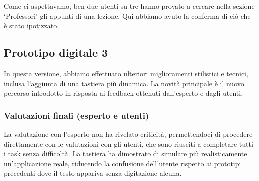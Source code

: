 Come ci aspettavamo, ben due utenti su tre hanno provato a cercare nella sezione ‘Professori’ gli appunti di una lezione. Qui abbiamo avuto la conferma di ciò che è stato ipotizzato.

\subsection{Prototipo digitale 3}
In questa versione, abbiamo effettuato ulteriori miglioramenti stilistici e tecnici, inclusa l’aggiunta di una tastiera più dinamica.
La novità principale è il nuovo percorso introdotto in risposta ai feedback ottenuti dall’esperto e dagli utenti.

\subsubsection{Valutazioni finali (esperto e utenti)}
La valutazione con l’esperto non ha rivelato criticità, permettendoci di procedere direttamente con le valutazioni con gli utenti, che sono riusciti a completare tutti i task senza difficoltà.
La tastiera ha dimostrato di simulare più realisticamente un’applicazione reale, riducendo la confusione dell’utente rispetto ai prototipi precedenti dove il testo appariva senza digitazione alcuna.
